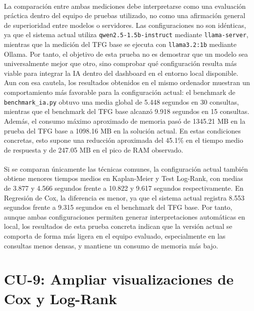 \paragraph*{}La comparación entre ambas mediciones debe interpretarse como una evaluación práctica dentro del equipo de pruebas utilizado, no como una afirmación general de superioridad entre modelos o servidores. Las configuraciones no son idénticas, ya que el sistema actual utiliza \texttt{qwen2.5-1.5b-instruct} mediante \texttt{llama-server}, mientras que la medición del TFG base se ejecuta con \texttt{llama3.2:1b} mediante Ollama. Por tanto, el objetivo de esta prueba no es demostrar que un modelo sea universalmente mejor que otro, sino comprobar qué configuración resulta más viable para integrar la IA dentro del dashboard en el entorno local disponible. Aun con esa cautela, los resultados obtenidos en el mismo ordenador muestran un comportamiento más favorable para la configuración actual: el benchmark de \texttt{benchmark\_ia.py} obtuvo una media global de 5.448 segundos en 30 consultas, mientras que el benchmark del TFG base alcanzó 9.918 segundos en 15 consultas. Además, el consumo máximo aproximado de memoria pasó de 1345.21 MB en la prueba del TFG base a 1098.16 MB en la solución actual. En estas condiciones concretas, esto supone una reducción aproximada del 45.1\% en el tiempo medio de respuesta y de 247.05 MB en el pico de RAM observado.

\paragraph*{}Si se comparan únicamente las técnicas comunes, la configuración actual también obtiene menores tiempos medios en Kaplan-Meier y Test Log-Rank, con medias de 3.877 y 4.566 segundos frente a 10.822 y 9.617 segundos respectivamente. En Regresión de Cox, la diferencia es menor, ya que el sistema actual registra 8.553 segundos frente a 9.315 segundos en el benchmark del TFG base. Por tanto, aunque ambas configuraciones permiten generar interpretaciones automáticas en local, los resultados de esta prueba concreta indican que la versión actual se comporta de forma más ligera en el equipo evaluado, especialmente en las consultas menos densas, y mantiene un consumo de memoria más bajo.

\Needspace{0.80\textheight}
\section{CU-9: Ampliar visualizaciones de Cox y Log-Rank}

